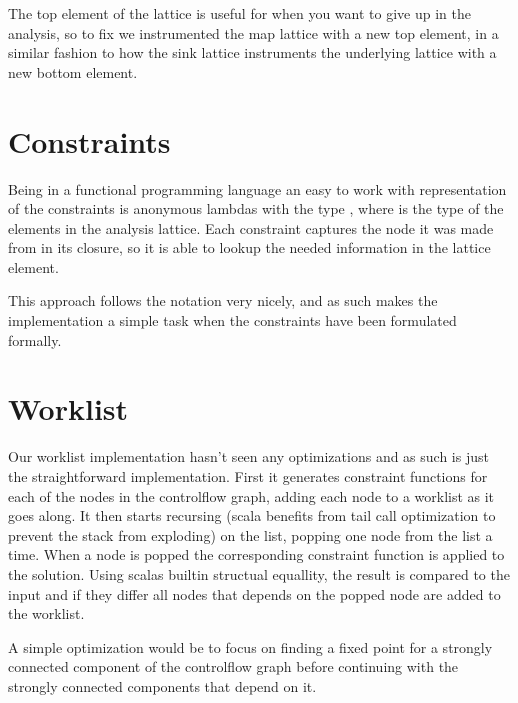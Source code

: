 The top element of the lattice is useful for when you want to give up in the analysis, so to fix we instrumented the map lattice with a new top element, 
in a similar fashion to how the sink lattice instruments the underlying lattice with a new bottom element. 

\section{Constraints}

Being in a functional programming language an easy to work with representation of the constraints is anonymous lambdas with the type , 
where  is the type of the elements in the analysis lattice. Each constraint captures the node it was made from in its closure, 
so it is able to lookup the needed information in the lattice element.

This approach follows the notation very nicely, and as such makes the implementation a simple task when the constraints have been formulated formally.

\section{Worklist}
Our worklist implementation hasn't seen any optimizations and as such is just the straightforward implementation.
First it generates constraint functions for each of the nodes in the controlflow graph, adding each node to a worklist as it goes along.
It then starts recursing (scala benefits from tail call optimization to prevent the stack from exploding) on the list, popping one node from the list a time.
When a node is popped the corresponding constraint function is applied to the solution. Using scalas builtin structual equallity, the result is compared to the input and
if they differ all nodes that depends on the popped node are added to the worklist.

A simple optimization would be to focus on finding a fixed point for a strongly connected component of the controlflow graph
before continuing with the strongly connected components that depend on it.


